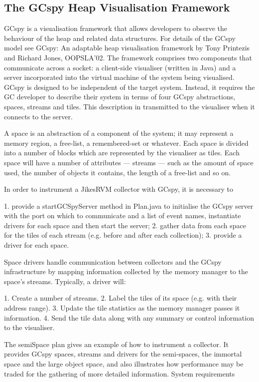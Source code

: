 \newcommand{\rvmRoot} {\tt \$RVM\_ROOT}

\subsection{The GCspy Heap Visualisation Framework}

GCspy is a visualisation framework that allows developers to observe the behaviour of the heap and related data structures. For details of the GCspy model see GCspy: An adaptable heap visualisation framework by Tony Printezis and Richard Jones, OOPSLA'02. The framework comprises two components that communicate across a socket: a client-side visualiser (written in Java) and a server incorporated into the virtual machine of the system being visualised. GCspy is designed to be independent of the target system. Instead, it requires the GC developer to describe their system in terms of four GCspy abstractions, spaces, streams and tiles. This description in transmitted to the visualiser when it connects to the server.

A space is an abstraction of a component of the system; it may represent a memory region, a free-list, a remembered-set or whatever. Each space is divided into a number of blocks which are represented by the visualiser as tiles. Each space will have a number of attributes --- streams --- such as the amount of space used, the number of objects it contains, the length of a free-list and so on.

In order to instrument a JikesRVM collector with GCspy, it is necessary to

   1. provide a startGCSpyServer method in Plan.java to initialise the GCspy server with the port on which to communicate and a list of event names, instantiate drivers for each space and then start the server;
   2. gather data from each space for the tiles of each stream (e.g. before and after each collection);
   3. provide a driver for each space. 

Space drivers handle communication between collectors and the GCspy infrastructure by mapping information collected by the memory manager to the space's streams. Typically, a driver will:

   1. Create a number of streams.
   2. Label the tiles of its space (e.g. with their address range).
   3. Update the tile statistics as the memory manager passes it information.
   4. Send the tile data along with any summary or control information to the visualiser. 

The semiSpace plan gives an example of how to instrument a collector. It provides GCspy spaces, streams and drivers for the semi-spaces, the immortal space and the large object space, and also illustrates how performance may be traded for the gathering of more detailed information.
System requirements

